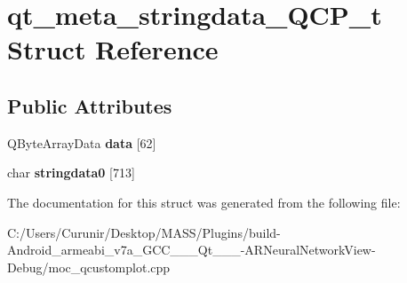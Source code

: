 \hypertarget{structqt__meta__stringdata___q_c_p__t}{}\section{qt\+\_\+meta\+\_\+stringdata\+\_\+\+Q\+C\+P\+\_\+t Struct Reference}
\label{structqt__meta__stringdata___q_c_p__t}
\subsection*{Public Attributes}
\begin{DoxyCompactItemize}
\item 
\mbox{\label{structqt__meta__stringdata___q_c_p__t_aedc8af34b954fbe94900facf03d4c21b}} 
Q\+Byte\+Array\+Data {\bfseries data} \mbox{[}62\mbox{]}
\item 
\mbox{\label{structqt__meta__stringdata___q_c_p__t_ae2ec8432b599c6d65c1b5d8bf47daaca}} 
char {\bfseries stringdata0} \mbox{[}713\mbox{]}
\end{DoxyCompactItemize}


The documentation for this struct was generated from the following file\+:\begin{DoxyCompactItemize}
\item 
C\+:/\+Users/\+Curunir/\+Desktop/\+M\+A\+S\+S/\+Plugins/build-\/\+Android\+\_\+armeabi\+\_\+v7a\+\_\+\+G\+C\+C\+\_\+\_\+\_\+\+Qt\+\_\+\_\+\_-\/\+A\+R\+Neural\+Network\+View-\/\+Debug/moc\+\_\+qcustomplot.\+cpp\end{DoxyCompactItemize}
